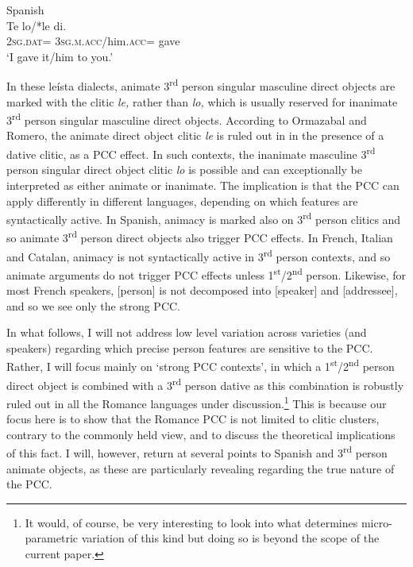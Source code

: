\documentclass[output=paper,colorlinks,citecolor=brown,nonflat]{./langscibook}
\begin{document}
\ea%
    \label{ex:sheehan:8}
    Spanish \citep[321]{OrmazabalRomero2007}\\
    \gll    Te     lo/*le     di.  \\
            \textsc{2sg}.\textsc{dat}=  \textsc{3sg.m.acc}/him.\textsc{acc}=  gave\\
    \glt    ‘I gave it/him to you.’
\z

In these leísta dialects, animate 3\textsuperscript{rd} person singular masculine direct objects are marked with the clitic \textit{le,} rather than \textit{lo,} which is usually reserved for inanimate 3\textsuperscript{rd} person singular masculine direct objects. According to Ormazabal and Romero, the animate direct object clitic \textit{le} is ruled out in  in the presence of a dative clitic, as a PCC effect. In such contexts, the inanimate masculine 3\textsuperscript{rd} person singular direct object clitic \textit{lo} is possible and can exceptionally be interpreted as either animate or inanimate. The implication is that the PCC can apply differently in different languages, depending on which features are syntactically active. In Spanish, animacy is marked also on 3\textsuperscript{rd} person clitics and so animate 3\textsuperscript{rd} person direct objects also trigger PCC effects. In French, Italian and Catalan, animacy is not syntactically active in 3\textsuperscript{rd} person contexts, and so animate arguments do not trigger PCC effects unless 1\textsuperscript{st}/2\textsuperscript{nd} person. Likewise, for most French speakers, [person] is not decomposed into [speaker] and [addressee], and so we see only the strong PCC.

In what follows, I will not address low level variation across varieties (and speakers) regarding which precise person features are sensitive to the PCC. Rather, I will focus mainly on ‘strong PCC contexts’, in which a 1\textsuperscript{st}/2\textsuperscript{nd} person direct object is combined with a 3\textsuperscript{rd} person dative as this combination is robustly ruled out in all the Romance languages under discussion.\footnote{It would, of course, be very interesting to look into what determines micro-parametric variation of this kind but doing so is beyond the scope of the current paper.}  This is because our focus here is to show that the Romance PCC is not limited to clitic clusters, contrary to the commonly held view, and to discuss the theoretical implications of this fact. I will, however, return at several points to Spanish and 3\textsuperscript{rd} person animate objects, as these are particularly revealing regarding the true nature of the PCC. 
\end{document}
